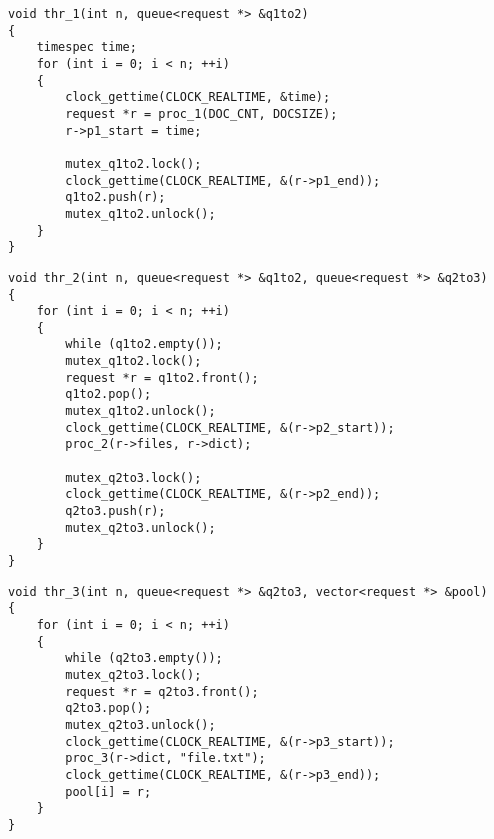 \begin{center}
	\captionsetup{justification=raggedright,singlelinecheck=off}
	\begin{lstlisting}[label=lst:slave1,caption=Поток для стадии 1]
void thr_1(int n, queue<request *> &q1to2)
{
	timespec time;
	for (int i = 0; i < n; ++i)
	{
		clock_gettime(CLOCK_REALTIME, &time);
		request *r = proc_1(DOC_CNT, DOCSIZE);
		r->p1_start = time;
		
		mutex_q1to2.lock();
		clock_gettime(CLOCK_REALTIME, &(r->p1_end));
		q1to2.push(r);
		mutex_q1to2.unlock();
	}
}
	\end{lstlisting}

	\begin{lstlisting}[label=lst:slave2,caption=Поток для стадии 2]
void thr_2(int n, queue<request *> &q1to2, queue<request *> &q2to3)
{
	for (int i = 0; i < n; ++i)
	{
		while (q1to2.empty());
		mutex_q1to2.lock();
		request *r = q1to2.front();
		q1to2.pop();
		mutex_q1to2.unlock();
		clock_gettime(CLOCK_REALTIME, &(r->p2_start));
		proc_2(r->files, r->dict);
		
		mutex_q2to3.lock();
		clock_gettime(CLOCK_REALTIME, &(r->p2_end));
		q2to3.push(r);
		mutex_q2to3.unlock();
	}
}
	\end{lstlisting}
\clearpage
	\begin{lstlisting}[label=lst:slave3,caption=Поток для стадии 3]
void thr_3(int n, queue<request *> &q2to3, vector<request *> &pool)
{
	for (int i = 0; i < n; ++i)
	{
		while (q2to3.empty());
		mutex_q2to3.lock();
		request *r = q2to3.front();
		q2to3.pop();
		mutex_q2to3.unlock();
		clock_gettime(CLOCK_REALTIME, &(r->p3_start));
		proc_3(r->dict, "file.txt");
		clock_gettime(CLOCK_REALTIME, &(r->p3_end));
		pool[i] = r;
	}
}

\end{lstlisting}
\end{center}

